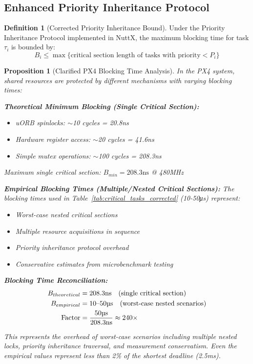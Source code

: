 \documentclass[11pt,a4paper]{article}
\newtheorem{proposition}[theorem]{Proposition}
\theoremstyle{definition}
\newtheorem{definition}[theorem]{Definition}
\theoremstyle{remark}
\begin{document}
\subsection{Enhanced Priority Inheritance Protocol}

\begin{definition}[Corrected Priority Inheritance Bound]
Under the Priority Inheritance Protocol implemented in NuttX, the maximum blocking time for task $\tau_i$ is bounded by:
\begin{equation}
B_i \leq \max\{\text{critical section length of tasks with priority} < P_i\}
\end{equation}
\end{definition}

\begin{proposition}[Clarified PX4 Blocking Time Analysis]
In the PX4 system, shared resources are protected by different mechanisms with varying blocking times:

\textbf{Theoretical Minimum Blocking (Single Critical Section):}
\begin{itemize}
    \item uORB spinlocks: $\sim$10 cycles = 20.8ns
    \item Hardware register access: $\sim$20 cycles = 41.6ns
    \item Simple mutex operations: $\sim$100 cycles = 208.3ns
\end{itemize}
Maximum single critical section: $B_{min} = 208.3\text{ns}$ @ 480MHz

\textbf{Empirical Blocking Times (Multiple/Nested Critical Sections):}
The blocking times used in Table~\ref{tab:critical_tasks_corrected} (10-50μs) represent:
\begin{itemize}
    \item Worst-case nested critical sections
    \item Multiple resource acquisitions in sequence
    \item Priority inheritance protocol overhead
    \item Conservative estimates from microbenchmark testing
\end{itemize}

\textbf{Blocking Time Reconciliation:}
\begin{align}
B_{theoretical} &= 208.3\text{ns} \quad \text{(single critical section)} \\
B_{empirical} &= 10\text{--}50\text{\textmu s} \quad \text{(worst-case nested scenarios)} \\
\text{Factor} &= \frac{50\text{\textmu s}}{208.3\text{ns}} \approx 240\times
\end{align}

This represents the overhead of worst-case scenarios including multiple nested locks, priority inheritance traversal, and measurement conservatism. Even the empirical values represent less than 2\% of the shortest deadline (2.5ms).
\end{proposition}
\end{document}

